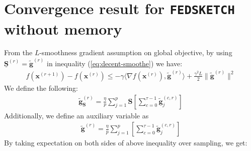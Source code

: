 \section{Convergence result for \texttt{FEDSKETCH} without memory}
From the $L$-smoothness gradient assumption on global objective, by using  $\underline{\mathbf{S}}^{(r)}=\tilde{\mathbf{g}}^{(r)}$ in inequality (\ref{eq:decent-smoothe}) we have:
\begin{align}
    f({\boldsymbol{x}}^{(r+1)})-f({\boldsymbol{x}}^{(r)})\leq -\gamma \big\langle\nabla f({\boldsymbol{x}}^{(r)}),\tilde{\mathbf{g}}^{(r)}\big\rangle+\frac{\gamma^2 L}{2}\|\tilde{\mathbf{g}}^{(r)}\|^2\label{eq:Lipschitz-c1}
\end{align}
We define the following:
\begin{align}
    \tilde{\mathbf{g}}_{\mathbf{S}}^{(r)}=\frac{\eta}{p}\sum_{j=1}^{p}\mathbf{S}\left[\sum_{c=0}^{\tau-1}\tilde{\mathbf{g}}_j^{(c,r)}\right]
\end{align}
Additionally, we define an auxiliary variable as 
\begin{align}
    \tilde{\mathbf{g}}^{(r)}=\frac{\eta}{p}\sum_{j=1}^{p}\left[\sum_{c=0}^{\tau-1}\tilde{\mathbf{g}}_j^{(c,r)}\right]
\end{align}
By taking expectation on both sides of above inequality over sampling, we get:
